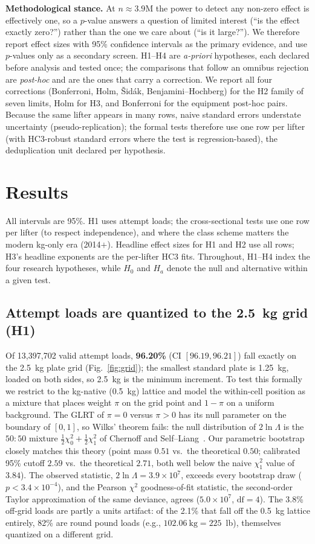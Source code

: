 \documentclass[conference]{IEEEtran}
\begin{document}
\textbf{Methodological stance.} At $n\!\approx\!3.9$M the power to detect any
non-zero effect is effectively one, so a $p$-value answers a question of limited
interest (``is the effect exactly zero?'') rather than the one we care about
(``is it large?''). We therefore report effect sizes with 95\% confidence intervals as the
primary evidence, and use $p$-values only as a secondary screen. H1--H4 are
\emph{a-priori} hypotheses, each declared before analysis and tested once; the
comparisons that follow an omnibus rejection are \emph{post-hoc} and are the ones
that carry a correction. We report all four corrections (Bonferroni, Holm,
\v{S}id\'ak, Benjamini--Hochberg) for the H2 family of seven limits, Holm for H3,
and Bonferroni for the equipment post-hoc pairs. Because the same lifter appears in many rows, naive standard errors
understate uncertainty (pseudo-replication); the formal tests therefore use one row
per lifter (with HC3-robust standard errors where the test is regression-based),
the deduplication unit declared per hypothesis.

\section{Results}
All intervals are 95\%. H1 uses attempt loads; the cross-sectional tests use one
row per lifter (to respect independence), and where the class scheme matters the
modern kg-only era (2014$+$). Headline effect sizes for H1 and H2 use all rows;
H3's headline exponents are the per-lifter HC3 fits. Throughout, H1--H4 index the
four research hypotheses, while $H_0$ and $H_a$ denote the null and alternative
within a given test.

\subsection{Attempt loads are quantized to the 2.5~kg grid (H1)}
Of 13{,}397{,}702 valid attempt loads, \textbf{96.20\%} (CI $[96.19,96.21]$) fall
exactly on the 2.5~kg plate grid (Fig.~\ref{fig:grid}); the smallest standard plate
is 1.25~kg, loaded on both sides, so 2.5~kg is the minimum increment. To test this
formally we restrict to the kg-native (0.5~kg) lattice and model the within-cell
position as a mixture that places weight $\pi$ on the grid point and $1-\pi$ on a
uniform background. The GLRT of $\pi=0$ versus $\pi>0$ has its null parameter on
the boundary of $[0,1]$, so Wilks' theorem fails: the null distribution of
$2\ln\Lambda$ is the $50{:}50$ mixture $\tfrac12\chi^2_0+\tfrac12\chi^2_1$ of
Chernoff and Self--Liang~\cite{chernoff,selfliang}. Our parametric bootstrap
closely matches this theory (point mass $0.51$ vs.\ the theoretical $0.50$;
calibrated 95\% cutoff $2.59$ vs.\ the theoretical $2.71$, both well below the
naive $\chi^2_1$ value of $3.84$). The observed statistic, $2\ln\Lambda=3.9\times10^7$,
exceeds every bootstrap draw ($p<3.4\times10^{-4}$), and the Pearson $\chi^2$
goodness-of-fit statistic, the second-order Taylor approximation of the same
deviance, agrees ($5.0\times10^7$, $\mathrm{df}=4$). The 3.8\% off-grid loads are partly a units artifact: of the
2.1\% that fall off the 0.5~kg lattice entirely, 82\% are round pound loads
(e.g., $102.06~\text{kg} = 225$~lb), themselves quantized on a different grid.
\end{document}
